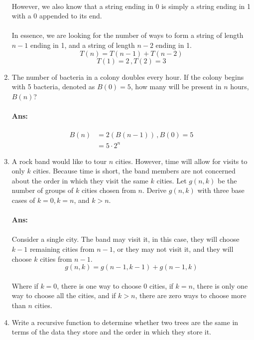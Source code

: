 \documentclass[letterpaper,12pt]{article}
\begin{document}
\begin{enumerate}[label=(\arabic*).]
        \paragraph{}However, we also know that a string ending in 0 is simply a string ending in 1
        with a 0 appended to its end.
        \paragraph{}In essence, we are looking for the number of ways to form a string of length
        $n-1$ ending in 1, and a string of length $n-2$ ending in 1.
        \[
            T(n) = T(n-1) + T(n-2) 
        \]
        \[
            T(1) = 2\,,T(2) = 3
        \]
        
    \item The number of bacteria in a colony doubles every hour. If the colony begins with 5 bacteria, denoted
as $B(0) = 5$, how many will be present in $n$ hours, $B(n)$?
\paragraph{Ans:}
\begin{align*}
    B(n) &= 2(B(n-1))\,, B(0) = 5\\
         &= 5\cdot 2^n
\end{align*}
    \item A rock band would like to tour $n$ cities. However, time will allow for visits to only $k$ cities. Because
time is short, the band members are not concerned about the order in which they visit the same $k$
cities. Let $g(n, k)$ be the number of groups of $k$ cities chosen from $n$. Derive $g(n, k)$ with three base
cases of $k = 0, k = n$, and $k > n$.
\paragraph{Ans:}
    \paragraph{}Consider a single city. The band may visit it, in this case, they will choose $k-1$ remaining
    cities from $n-1$, or they may not visit it, and they will choose $k$ cities from $n-1$.
    \[
        g(n,k) = g(n-1, k-1) + g(n-1, k)
    \]
    \paragraph{}Where if $k=0$, there is one way to choose 0 cities, if $k = n$, there is only one way to 
    choose all the cities, and if $k > n$, there are zero ways to choose more than $n$ cities.
    \item Write a recursive function to determine whether two trees are the same in terms of the data they store
and the order in which they store it.


\end{enumerate}
\end{document}
